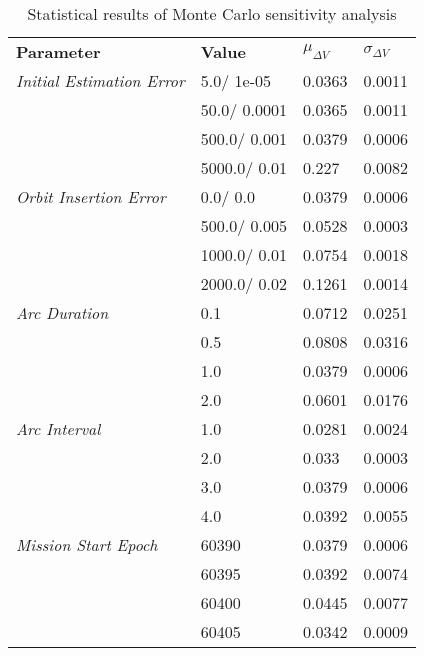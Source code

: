 
                    \begin{table}[]
                    \centering
                    \begin{tabular}{l l l l}
                    \rowcolor[HTML]{EFEFEF} \textbf{Parameter} & \textbf{Value} & \textbf{$\mu_{\Delta V}$} & \textbf{$\sigma_{\Delta V}$} \\
                    \textit{Initial Estimation Error} & 5.0/
1e-05 & 0.0363 & 0.0011 \\
 & 50.0/
0.0001 & 0.0365 & 0.0011 \\
 & 500.0/
0.001 & 0.0379 & 0.0006 \\
 & 5000.0/
0.01 & 0.227 & 0.0082 \\
\textit{Orbit Insertion Error} & 0.0/
0.0 & 0.0379 & 0.0006 \\
 & 500.0/
0.005 & 0.0528 & 0.0003 \\
 & 1000.0/
0.01 & 0.0754 & 0.0018 \\
 & 2000.0/
0.02 & 0.1261 & 0.0014 \\
\textit{Arc Duration} & 0.1 & 0.0712 & 0.0251 \\
 & 0.5 & 0.0808 & 0.0316 \\
 & 1.0 & 0.0379 & 0.0006 \\
 & 2.0 & 0.0601 & 0.0176 \\
\textit{Arc Interval} & 1.0 & 0.0281 & 0.0024 \\
 & 2.0 & 0.033 & 0.0003 \\
 & 3.0 & 0.0379 & 0.0006 \\
 & 4.0 & 0.0392 & 0.0055 \\
\textit{Mission Start Epoch} & 60390 & 0.0379 & 0.0006 \\
 & 60395 & 0.0392 & 0.0074 \\
 & 60400 & 0.0445 & 0.0077 \\
 & 60405 & 0.0342 & 0.0009 \\

                    \end{tabular}
                    \caption{Statistical results of Monte Carlo sensitivity analysis}
                    \label{tab:SensitivityAnalysis}
                    \end{table}
                    